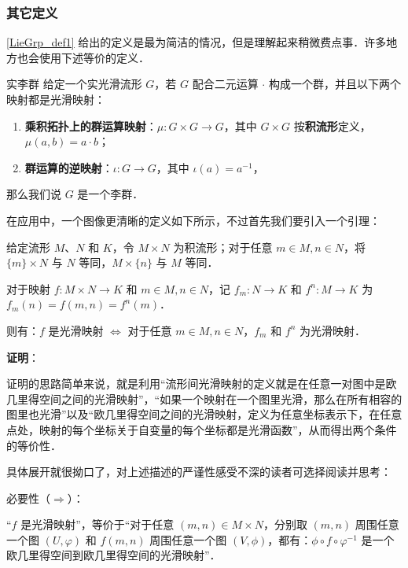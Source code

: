 \subsubsection{其它定义}

\autoref{LieGrp_def1} 给出的定义是最为简洁的情况，但是理解起来稍微费点事．许多地方也会使用下述等价的定义．

\begin{definition}{实李群}\label{LieGrp_def3}
给定一个实光滑流形 $G$，若 $G$ 配合二元运算 $\cdot$ 构成一个群，并且以下两个映射都是光滑映射：
\begin{enumerate}
\item \textbf{乘积拓扑上的群运算映射}：$\mu:G\times G\to G$，其中 $G\times G$ 按\textbf{积流形}定义，$\mu(a,b)=a\cdot b$；
\item \textbf{群运算的逆映射}：$\iota:G\to G$，其中 $\iota(a)=a^{-1}$，
\end{enumerate}
那么我们说 $G$ 是一个李群．
\end{definition}

在应用中，一个图像更清晰的定义如下所示，不过首先我们要引入一个引理：

\begin{lemma}{}\label{LieGrp_lem1}
给定流形 $M$、$N$ 和 $K$，令 $M\times N$ 为积流形；对于任意 $m\in M, n\in N$，将 $\{m\}\times N$ 与 $N$ 等同，$M\times \{n\}$ 与 $M$ 等同．

对于映射 $f:M\times N\to K$ 和 $m\in M, n\in N$，记 $f_m:N\to K$ 和 $f^n:M\to K$ 为 $f_m(n)=f(m, n)=f^n(m)$．

则有：$f$ 是光滑映射 $\iff$ 对于任意 $m\in M, n\in N$，$f_m$ 和 $f^n$ 为光滑映射．
\end{lemma}

\textbf{证明}：

证明的思路简单来说，就是利用“流形间光滑映射的定义就是在任意一对图中是欧几里得空间之间的光滑映射”，“如果一个映射在一个图里光滑，那么在所有相容的图里也光滑”以及“欧几里得空间之间的光滑映射，定义为任意坐标表示下，在任意点处，映射的每个坐标关于自变量的每个坐标都是光滑函数”，从而得出两个条件的等价性．

具体展开就很拗口了，对上述描述的严谨性感受不深的读者可选择阅读并思考：

必要性（$\Rightarrow$）：

“$f$ 是光滑映射”，等价于“对于任意 $(m, n)\in M\times N$，分别取 $(m, n)$ 周围任意一个图 $(U, \varphi)$ 和 $f(m, n)$ 周围任意一个图 $(V, \phi)$，都有：$\phi\circ f\circ\varphi^{-1}$ 是一个欧几里得空间到欧几里得空间的光滑映射”．

